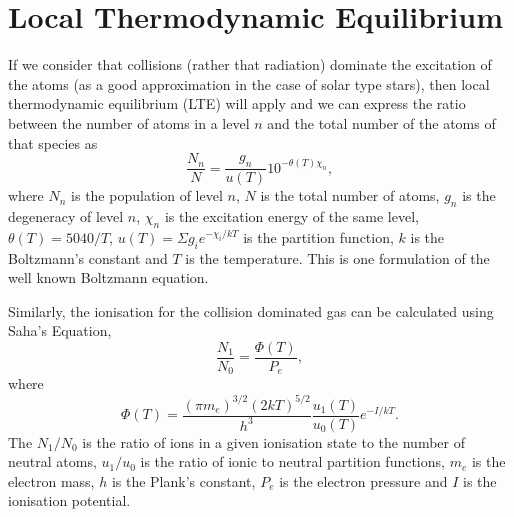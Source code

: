 \documentclass[dvips,12pt,a4paper]{report}
\begin{document}
{%

\section {Local Thermodynamic Equilibrium}
\label{LTE}
If we consider that collisions (rather that radiation) dominate the excitation of the atoms (as a good approximation in the case of solar type stars), then local thermodynamic equilibrium (LTE) will apply and we can express the ratio between the number of atoms in a level $n$ and the total number of the atoms of that species as
\begin{equation}
\label{Boltz}
 \frac{N_n}{N}=\frac{g_n}{u(T)}10^{-\theta(T)\chi_n},
\end{equation}
where $N_n$ is the population of level $n$, $N$ is the total number of atoms, $g_n$ is the degeneracy of level $n$, $\chi_n$ is the excitation energy of the same level, $\theta(T)=5040/T$, $u(T)=\Sigma g_ie^{-\chi_i/kT}$ is the partition function, $k$ is the Boltzmann's constant and $T$ is the temperature. This is one formulation of the well known Boltzmann equation. %

Similarly, the ionisation for the collision dominated gas can be calculated using Saha's Equation,
\begin{equation}
\label{Saha}
\frac{N_1}{N_0}=\frac{\Phi(T)}{P_e},
\end{equation}
where
\begin {equation}
\Phi(T)=\frac{(\pi m_e)^{3/2}(2kT)^{5/2}}{h^3}\frac{u_1(T)}{u_0(T)}e^{-I/kT}.
\end {equation}
The $N_1/N_0$ is the ratio of ions in a given ionisation state  to the number of neutral atoms, $u_1/u_0$ is the ratio of ionic to neutral partition functions, $m_e$ is the electron mass, $h$ is the Plank's constant, $P_e$ is the electron pressure and $I$ is the ionisation potential.




}
\end{document}
